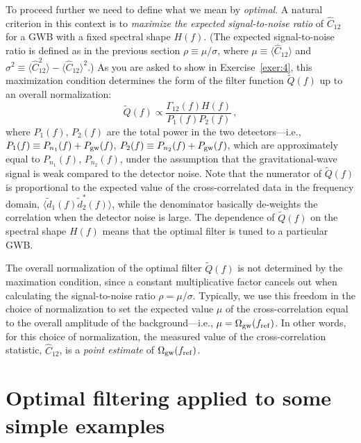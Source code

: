 \documentclass[11pt]{article}
\numberwithin{equation}{section}
\def\be{\begin{equation}}
\def\ee{\end{equation}}
\begin{document}
To proceed further we need to define what we mean by
{\em optimal}.
A natural criterion in this context is to 
{\em maximize the expected signal-to-noise ratio} 
of $\hat C_{12}$ 
for a GWB with a fixed spectral shape $H(f)$.
(The expected signal-to-noise ratio is defined as 
in the previous section
$\rho\equiv \mu/\sigma$, where 
$\mu\equiv\langle \hat C_{12}\rangle$
and 
$\sigma^2\equiv \langle \hat C_{12}^2\rangle -\langle
\hat C_{12}\rangle^2$.) 
As you are asked to show in Exercise~\ref{exer:4},
this maximization condition  determines the form of the 
filter 
function $\tilde Q(f)$ up to an overall normalization:
%
\be
\tilde Q(f) \propto \frac{\Gamma_{12}(f) H(f)}
{P_1(f) P_2(f)}\,,
\ee
%
where $P_1(f)$, $P_2(f)$ are the total power in the two
detectors---i.e., 
$P_1(f) \equiv P_{n_1}(f) + P_{\rm gw}(f)$,
$P_2(f) \equiv P_{n_2}(f) + P_{\rm gw}(f)$, 
which are approximately equal to 
$P_{n_1}(f)$, $P_{n_2}(f)$, under the assumption that 
the gravitational-wave signal is 
weak compared to the detector noise.
Note that the numerator of $\tilde Q(f)$ is proportional
to the expected value of the cross-correlated data in
the frequency domain, 
$\langle \tilde d_1(f)\tilde d_2^*(f)\rangle$,
while the denominator basically de-weights the 
correlation when the detector noise is large.
The dependence of $\tilde Q(f)$ on the spectral shape
$H(f)$ means that the optimal filter is tuned to a 
particular GWB.

The overall normalization of the optimal filter $\tilde Q(f)$ 
is not determined by the maximation condition, since
a constant multiplicative factor cancels out when
calculating  the signal-to-noise ratio $\rho=\mu/\sigma$.  
Typically, we use this freedom in the choice of 
normalization to set the expected value $\mu$ of the
cross-correlation equal to the overall amplitude of 
the background---i.e., $\mu = \Omega_{\rm gw}(f_{\rm ref})$.
In other words, for this choice of normalization, 
the measured value of the 
cross-correlation statistic, $\hat C_{12}$, is a 
{\em point estimate} of $\Omega_{\rm gw}(f_{\rm ref})$.

\section{Optimal filtering applied to some simple examples}
\label{s:simple_examples}
\end{document}
